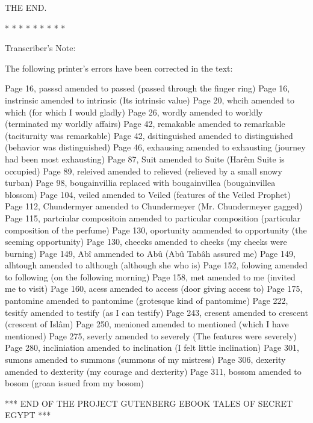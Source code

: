      THE END.




     *       *       *       *       *
         *       *       *       *




Transcriber's Note:


The following printer's errors have been corrected in the text:

  Page 16, passsd amended to passed (passed through the finger ring)
  Page 16, instrinsic amended to intrinsic (Its intrinsic value)
  Page 20, whcih amended to which (for which I would gladly)
  Page 26, wordly amended to worldly (terminated my worldly affairs)
  Page 42, remakable amended to remarkable (taciturnity was remarkable)
  Page 42, dsitinguished amended to distinguished (behavior was
    distinguished)
  Page 46, exhausing amended to exhausting (journey had been most
    exhausting)
  Page 87, Suit amended to Suite (Harêm Suite is occupied)
  Page 89, releived amended to relieved (relieved by a small snowy
    turban)
  Page 98, bougainvillia replaced with bougainvillea (bougainvillea
    blossom)
  Page 104, veiled amended to Veiled (features of the Veiled Prophet)
  Page 112, Chundermyer amended to Chundermeyer (Mr. Chundermeyer
    gagged)
  Page 115, partciular compositoin amended to particular composition
    (particular composition of the perfume)
  Page 130, oportunity ammended to opportunity (the seeming opportunity)
  Page 130, cheecks amended to cheeks (my cheeks were burning)
  Page 149, Abî ammended to Abû (Abû Tabâh assured me)
  Page 149, alhtough amended to although (although she who is)
  Page 152, folowing amended to following (on the following morning)
  Page 158, met amended to me (invited me to visit)
  Page 160, acess amended to access (door giving access to)
  Page 175, pantomine amended to pantomime (grotesque kind of pantomime)
  Page 222, tesitfy amended to testify (as I can testify)
  Page 243, cresent amended to crescent (crescent of Islâm)
  Page 250, menioned amended to mentioned (which I have mentioned)
  Page 275, severly amended to severely (The features were severely)
  Page 280, incliniation amended to inclination (I felt little
    inclination)
  Page 301, sumons amended to summons (summons of my mistress)
  Page 306, dexerity amended to dexterity (my courage and dexterity)
  Page 311, bossom amended to bosom (groan issued from my bosom)



*** END OF THE PROJECT GUTENBERG EBOOK TALES OF SECRET EGYPT ***




